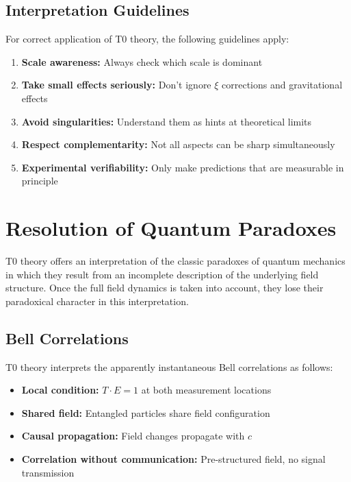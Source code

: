 	\subsection{Interpretation Guidelines}
	
	For correct application of T0 theory, the following guidelines apply:
	
	\begin{enumerate}
		\item \textbf{Scale awareness:} Always check which scale is dominant
		\item \textbf{Take small effects seriously:} Don't ignore $\xi$ corrections and gravitational effects
		\item \textbf{Avoid singularities:} Understand them as hints at theoretical limits
		\item \textbf{Respect complementarity:} Not all aspects can be sharp simultaneously
		\item \textbf{Experimental verifiability:} Only make predictions that are measurable in principle
	\end{enumerate}
	
	\section{Resolution of Quantum Paradoxes}
	
	T0 theory offers an interpretation of the classic paradoxes of quantum mechanics in which they result from an incomplete description of the underlying field structure. Once the full field dynamics is taken into account, they lose their paradoxical character in this interpretation.
	
	\subsection{Bell Correlations}
	
	T0 theory interprets the apparently instantaneous Bell correlations as follows:
	
	\begin{itemize}
		\item \textbf{Local condition:} $T \cdot E = 1$ at both measurement locations
		\item \textbf{Shared field:} Entangled particles share field configuration
		\item \textbf{Causal propagation:} Field changes propagate with $c$
		\item \textbf{Correlation without communication:} Pre-structured field, no signal transmission
	\end{itemize}
	
